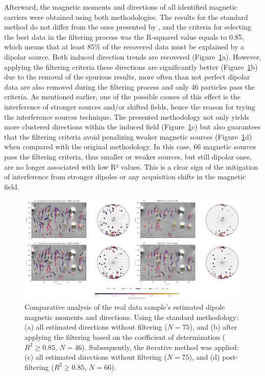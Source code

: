 Afterward, the magnetic moments and directions of all identified magnetic carriers were obtained using both methodologies. The results for the standard method do not differ from the ones presented by \citet{Souza-Junior2023b}, and the criteria for selecting the best data in the filtering process was the R-squared value \citep[similar to the dipolarity parameter,][]{Fu2020} equals to 0.85, which means that at least 85\% of the recovered data must be explained by a dipolar source. Both induced direction trends are recovered (Figure~\ref{real-data-stereograms}a). However, applying the filtering criteria these directions are significantly better (Figure~\ref{real-data-stereograms}b) due to the removal of the spurious results, more often than not perfect dipolar data are also removed during the filtering process and only 46 particles pass the criteria. As mentioned earlier, one of the possible causes of this effect is the interference of stronger sources and/or shifted fields, hence the reason for trying the interference sources technique. The presented methodology not only yields more clustered directions within the induced field (Figure~\ref{real-data-stereograms}c) but also guarantees that the filtering criteria avoid penalizing weaker magnetic sources (Figure~\ref{real-data-stereograms}d) when compared with the original methodology. In this case, 66 magnetic sources pass the filtering criteria, thus smaller or weaker sources, but still dipolar ones, are no longer associated with low R² values. This is a clear sign of the mitigation of interference from stronger dipoles or any acquisition shifts in the magnetic field.  


\begin{figure}[tb!]
  \centering
  \includegraphics[width=1\linewidth]{paper/figures/real-data-stereograms.png}
  \caption{
Comparative analysis of the real data sample's estimated dipole magnetic moments and directions. Using the standard methodology: (a) all estimated directions without filtering ($N = 75$), and (b) after applying the filtering based on the coefficient of determination ($R^2 \geq 0.85$, $N = 46$). Subsequently, the iterative method was applied: (c) all estimated directions without filtering ($N = 75$), and (d) post-filtering ($R^2 \geq 0.85$, $N = 66$).
}
  \label{real-data-stereograms}
\end{figure}
